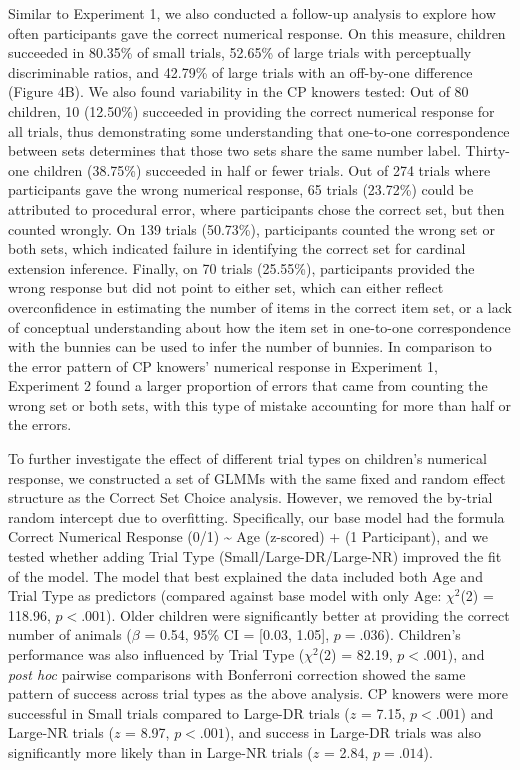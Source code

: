 \documentclass[
  man,floatsintext]{apa7}
\begin{document}
Similar to Experiment 1, we also conducted a follow-up analysis to explore how often participants gave the correct numerical response. On this measure, children succeeded in 80.35\% of small trials, 52.65\% of large trials with perceptually discriminable ratios, and 42.79\% of large trials with an off-by-one difference (Figure 4B). We also found variability in the CP knowers tested: Out of 80 children, 10 (12.50\%) succeeded in providing the correct numerical response for all trials, thus demonstrating some understanding that one-to-one correspondence between sets determines that those two sets share the same number label. Thirty-one children (38.75\%) succeeded in half or fewer trials. Out of 274 trials where participants gave the wrong numerical response, 65 trials (23.72\%) could be attributed to procedural error, where participants chose the correct set, but then counted wrongly. On 139 trials (50.73\%), participants counted the wrong set or both sets, which indicated failure in identifying the correct set for cardinal extension inference. Finally, on 70 trials (25.55\%), participants provided the wrong response but did not point to either set, which can either reflect overconfidence in estimating the number of items in the correct item set, or a lack of conceptual understanding about how the item set in one-to-one correspondence with the bunnies can be used to infer the number of bunnies. In comparison to the error pattern of CP knowers' numerical response in Experiment 1, Experiment 2 found a larger proportion of errors that came from counting the wrong set or both sets, with this type of mistake accounting for more than half or the errors.

To further investigate the effect of different trial types on children's numerical response, we constructed a set of GLMMs with the same fixed and random effect structure as the Correct Set Choice analysis. However, we removed the by-trial random intercept due to overfitting. Specifically, our base model had the formula Correct Numerical Response (0/1) \textasciitilde{} Age (z-scored) + (1 \textbar{} Participant), and we tested whether adding Trial Type (Small/Large-DR/Large-NR) improved the fit of the model. The model that best explained the data included both Age and Trial Type as predictors (compared against base model with only Age: \(\chi^2\)(2) = 118.96, \(p < .001\)). Older children were significantly better at providing the correct number of animals (\(\beta\) = 0.54, 95\% CI = {[}0.03, 1.05{]}, \(p = .036\)). Children's performance was also influenced by Trial Type (\(\chi^2\)(2) = 82.19, \(p < .001\)), and \emph{post hoc} pairwise comparisons with Bonferroni correction showed the same pattern of success across trial types as the above analysis. CP knowers were more successful in Small trials compared to Large-DR trials (\(z\) = 7.15, \(p < .001\)) and Large-NR trials (\(z\) = 8.97, \(p < .001\)), and success in Large-DR trials was also significantly more likely than in Large-NR trials (\(z\) = 2.84, \(p = .014\)).
\end{document}
